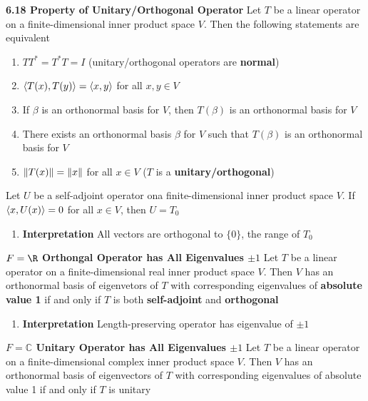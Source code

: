 \documentclass[11pt]{article}
\begin{document}
\begin{theorem*}
    \textbf{6.18 Property of Unitary/Orthogonal Operator} Let $T$ be a linear operator on a finite-dimensional inner product space $V$. Then the following statements are equivalent 
    \begin{enumerate}
        \item $TT^* = T^*T = I$ (unitary/orthogonal operators are \textbf{normal})
        \item $\langle T(x),T(y)\rangle = \langle x,y\rangle$ for all $x,y\in V$
        \item If $\beta$ is an orthonormal basis for $V$, then $T(\beta)$ is an orthonormal basis for $V$ 
        \item There exists an orthonormal basis $\beta$ for $V$ such that $T(\beta)$ is an orthonormal basis for $V$ 
        \item $\left\lVert T(x)\right\rVert = \left\lVert x\right\rVert$ for all $x\in V$ ($T$ is a \textbf{unitary/orthogonal})
    \end{enumerate}
\end{theorem*}

\begin{lemma*}
    Let $U$ be a self-adjoint operator ona finite-dimensional inner product space $V$. If $\langle x,U(x)\rangle = 0$ for all $x\in V$, then $U = T_0$
    \begin{enumerate}
        \item \textbf{Interpretation} All vectors are orthogonal to $\{ 0 \}$, the range of $T_0$
    \end{enumerate}
\end{lemma*}

\begin{corollary*}
    \textbf{$F=\R$ Orthongal Operator has All Eigenvalues $\pm 1$} Let $T$ be a linear operator on a finite-dimensional real inner product space $V$. Then $V$ has an orthonormal basis of eigenvetors of $T$ with corresponding eigenvalues of \textbf{absolute value 1} if and only if $T$ is both \textbf{self-adjoint} and \textbf{orthogonal}
    \begin{enumerate}
        \item \textbf{Interpretation} Length-preserving operator has eigenvalue of $\pm 1$
    \end{enumerate}
\end{corollary*}

\begin{corollary*}
    \textbf{$F=\mathbb{C}$ Unitary Operator has All Eigenvalues $\pm 1$} Let $T$ be a linear operator on a finite-dimensional complex inner product space $V$. Then $V$ has an orthonormal basis of eigenvectors of $T$ with corresponding eigenvalues of absolute value 1 if and only if $T$ is unitary
\end{corollary*}
\end{document}
